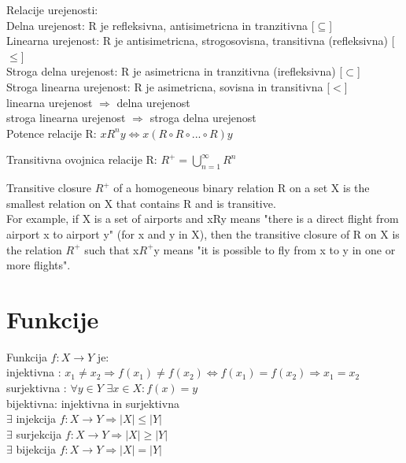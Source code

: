\documentclass{article}
\begin{document}
Relacije urejenosti: \\
Delna urejenost: R je refleksivna, antisimetricna in tranzitivna [$\subseteq$]\\
Linearna urejenost: R je antisimetricna, strogosovisna, transitivna (refleksivna) [$\leq$]\\ 
Stroga delna urejenost: R je asimetricna in tranzitivna (irefleksivna) [$\subset$] \\
Stroga linearna urejenost: R je asimetricna, sovisna in transitivna [$<$] \\
linearna urejenost $\Rightarrow$ delna urejenost \\
stroga linearna urejenost $\Rightarrow$ stroga delna urejenost \\

Potence relacije R: $xR^{n}y \Leftrightarrow x(R \circ R \circ ... \circ R)y$

Transitivna ovojnica relacije R: $R^{+} = \bigcup_{n=1}^{\infty} R^{n}$

Transitive closure $R^{+}$ of a homogeneous binary relation R on a set X is the smallest relation on X that contains R and is transitive.\\
For example, if X is a set of airports and xRy means "there is a direct flight from airport x to airport y" (for x and y in X), then the transitive closure of R on X is the relation $R^+$ such that x$R^+$y means "it is possible to fly from x to y in one or more flights".

\section { Funkcije }
Funkcija $f: X \rightarrow Y$ je: \\
injektivna : $x_1 \neq x_2 \Rightarrow f(x_1) \neq f(x_2) \Leftrightarrow f(x_1) = f(x_2) \Rightarrow x_1 = x_2$ \\
surjektivna : $\forall y \in Y$ $\exists x \in X: f(x) = y$ \\
bijektivna: injektivna in surjektivna \\
$\exists$ injekcija $f: X \rightarrow Y \Rightarrow |X| \leq |Y|$ \\
$\exists$ surjekcija $f: X \rightarrow Y \Rightarrow |X| \geq |Y|$ \\
$\exists$ bijekcija $f: X \rightarrow Y \Rightarrow |X| = |Y|$ \\


\end{document}
